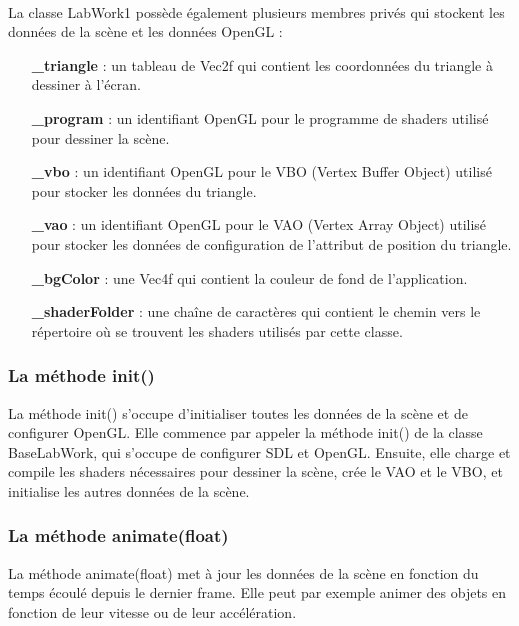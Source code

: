 \documentclass[10pt,a4paper]{article}
\begin{document}
		\paragraph{} %
			La classe LabWork1 possède également plusieurs membres privés qui stockent les données de la scène et les données OpenGL :
		
		\begin{itemize}
			\item[\textbf{\_triangle}] : un tableau de Vec2f qui contient les coordonnées du triangle à dessiner à l'écran.
			\item[\textbf{\_program}] : un identifiant OpenGL pour le programme de shaders utilisé pour dessiner la scène.
			\item[\textbf{\_vbo}] : un identifiant OpenGL pour le VBO (Vertex Buffer Object) utilisé pour stocker les données du triangle.
			\item[\textbf{\_vao}] : un identifiant OpenGL pour le VAO (Vertex Array Object) utilisé pour stocker les données de configuration de l'attribut de position du triangle.
			\item[\textbf{\_bgColor}] : une Vec4f qui contient la couleur de fond de l'application.
			\item[\textbf{\_shaderFolder}] : une chaîne de caractères qui contient le chemin vers le répertoire où se trouvent les shaders utilisés par cette classe.
		\end{itemize}
		
		\subsubsection{La méthode init()} %
			La méthode init() s'occupe d'initialiser toutes les données de la scène et de configurer OpenGL. Elle commence par appeler la méthode init() de la classe BaseLabWork, qui s'occupe de configurer SDL et OpenGL. Ensuite, elle charge et compile les shaders nécessaires pour dessiner la scène, crée le VAO et le VBO, et initialise les autres données de la scène.

		\subsubsection{La méthode animate(float)} %
			La méthode animate(float) met à jour les données de la scène en fonction du temps écoulé depuis le dernier frame. Elle peut par exemple animer des objets en fonction de leur vitesse ou de leur accélération.
\end{document}
